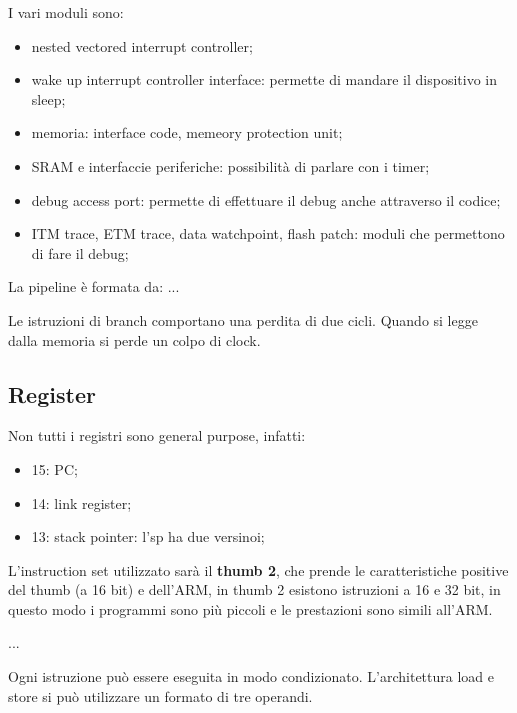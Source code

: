 \documentclass[12pt]{article}
\begin{document}
I vari moduli sono:
\begin{itemize}
    \item nested vectored interrupt controller;
    \item wake up interrupt controller interface: permette di mandare il dispositivo in sleep;
    \item memoria: interface code, memeory protection unit;
    \item SRAM e interfaccie periferiche: possibilit\`a di parlare con i timer;
    \item debug access port: permette di effettuare il debug anche attraverso il codice;
    \item ITM trace, ETM trace, data watchpoint, flash patch: moduli che permettono di fare il debug;
\end{itemize}

La pipeline \`e formata da:
...

Le istruzioni di branch comportano una perdita di due cicli. Quando si legge dalla memoria si perde un colpo di clock.

\subsection{Register}
Non tutti i registri sono general purpose, infatti:
\begin{itemize}
    \item 15: PC;
    \item 14: link register;
    \item 13: stack pointer: l'sp ha due versinoi;
\end{itemize}

L'instruction set utilizzato sar\`a il \textbf{thumb 2}, che prende le caratteristiche positive del thumb (a 16 bit) e dell'ARM, in thumb 2 esistono istruzioni a 16 e 32 bit, in questo modo i programmi sono pi\`u piccoli e le prestazioni sono simili all'ARM.

...

Ogni istruzione pu\`o essere eseguita in modo condizionato. L'architettura load e store si pu\`o utilizzare un formato di tre operandi.
\end{document}
